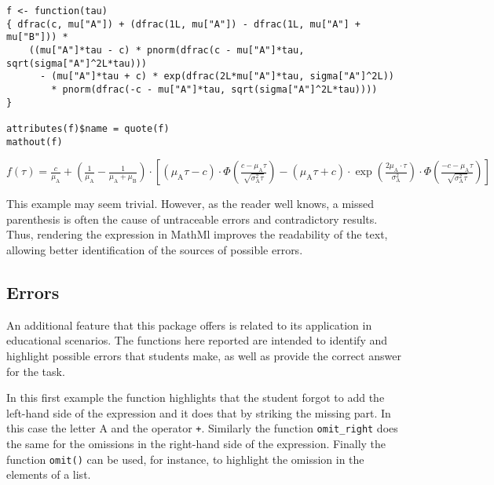 \begin{verbatim}
f <- function(tau)
{ dfrac(c, mu["A"]) + (dfrac(1L, mu["A"]) - dfrac(1L, mu["A"] + mu["B"])) * 
    ((mu["A"]*tau - c) * pnorm(dfrac(c - mu["A"]*tau, sqrt(sigma["A"]^2L*tau)))
      - (mu["A"]*tau + c) * exp(dfrac(2L*mu["A"]*tau, sigma["A"]^2L))
        * pnorm(dfrac(-c - mu["A"]*tau, sqrt(sigma["A"]^2L*tau))))
}

attributes(f)$name = quote(f)
mathout(f)
\end{verbatim}

\({{{f}\left(\tau\right)}={\displaystyle{\frac{{c}}{{\mu_\mathrm{A}}}}+{\left({\displaystyle{\frac{{1}}{{\mu_\mathrm{A}}}}-\displaystyle{\frac{{1}}{{{\mu_\mathrm{A}}+{\mu_\mathrm{B}}}}}}\right)\cdot\left[{{\left({{{\mu_\mathrm{A}}{}\tau}-{c}}\right)\cdot{\Phi\left(\displaystyle{\frac{{{c}-{{\mu_\mathrm{A}}{}\tau}}}{\sqrt{{{\sigma_\mathrm{A}^{2}}{}\tau}}}}\right)}}-{{\left({{{\mu_\mathrm{A}}{}\tau}+{c}}\right)\cdot{\exp\left(\displaystyle{\frac{{{{2}{}{\mu_\mathrm{A}}}\cdot\tau}}{{\sigma_\mathrm{A}^{2}}}}\right)}}\cdot{\Phi\left(\displaystyle{\frac{{{-{c}}-{{\mu_\mathrm{A}}{}\tau}}}{\sqrt{{{\sigma_\mathrm{A}^{2}}{}\tau}}}}\right)}}}\right]}}}\)

This example may seem trivial. However, as the reader well knows, a missed parenthesis is often the cause of untraceable errors and contradictory results. Thus, rendering the expression in MathMl improves the readability of the text, allowing better identification of the sources of possible errors.

\hypertarget{errors}{%
\subsection{Errors}\label{errors}}

An additional feature that this package offers is related to its application in educational scenarios. The functions here reported are intended to identify and highlight possible errors that students make, as well as provide the correct answer for the task.

In this first example the function highlights that the student forgot to add the left-hand side of the expression and it does that by striking the missing part. In this case the letter A and the operator \texttt{+}.
Similarly the function \texttt{omit\_right} does the same for the omissions in the right-hand side of the expression. Finally the function \texttt{omit()} can be used, for instance, to highlight the omission in the elements of a list.

